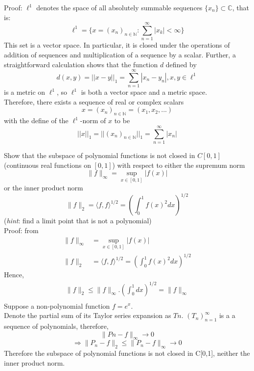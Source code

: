 \documentclass [12pt,letterpaper]{exam}
\begin{document}
\begin{questions}
Proof: $\ell^1$ denotes the space of all absolutely summable sequences $\big\{ x_n \big\} \subset \mathbb{C}$, that is: 
$$\ell^1 = \big\{ {x = (x_n)_{n \in \mathbb{N}} : \sum_{n=1}^\infty |x_k|<\infty}\big\}$$
This set is a vector space. In particular, it is closed under the operations of addition of sequences and multiplication of a sequence by a scalar. Further, a straightforward calculation shows that the function $d$ defined by 
$$d(x,y) = {||x-y||}_1 = \sum_{n=1}^\infty |x_n - y_n|, x,y \in \ell^1$$
is a metric on $\ell^1$, so $\ell^1$ is both a vector space and a metric space.\\
Therefore, there exists a sequence of real or complex scalars
$$x = (x_{n})_{n \in \mathbb{N}} = (x_1,x_2,...)$$
with the define of the $\ell^1$-norm of $x$ to be
$$||x||_1 = ||(x_n)_{n \in \mathbb{N}}||_1 = \sum_{n=1}^\infty |x_n|$$

\question %
Show that the subspace of polynomial functions is not closed in $C[0,1]$ (continuous real functions on $[0,1]$)
with respect to either the supremum norm
$$
\lVert f\rVert_{\infty} = \sup_{x\in [0,1]} \lvert f(x)\rvert
$$
or the inner product norm
$$
\lVert f\rVert_2 = \langle f, f\rangle^{1/2} = \left(\int_{0}^{1} f(x)^2 dx\right)^{1/2}
$$
(\textit{hint}: find a limit point that is not a polynomial)\\

Proof: from
\begin{equation}
\begin{split}
\lVert f\rVert_{\infty} & = \sup_{x\in [0,1]} \lvert f(x)\rvert\\
\lVert f\rVert_2 &= \langle f, f\rangle^{1/2} = \left(\int_{0}^{1} f(x)^2 dx\right)^{1/2}
\end{split}
\end{equation}
Hence,
\begin{equation}
\begin{split}
\lVert f\rVert_2 \leq \lVert f\rVert_{\infty}.\left(\int_{0}^{1} dx \right)^{1/2}=\lVert f\rVert_{\infty} \tag{1}\\
\end{split}
\end{equation}
Suppose a non-polynomial function $f = e^x$. \\
Denote the partial sum of its Taylor series expansion as $Tn$. $(T_n)^{\infty}_{n=1}$ is a a sequence of polynomials, therefore,
$$
\lVert Pn-f\rVert_{\infty}\to 0 $$
$$ \Rightarrow
\lVert P_n-f\rVert_2 \leq \lVert P_n-f\rVert_{
\infty} \to 0 $$
Therefore the subspace of polynomial functions is not closed in C[0,1], neither the inner product norm.\\


\end{questions}
\end{document}
